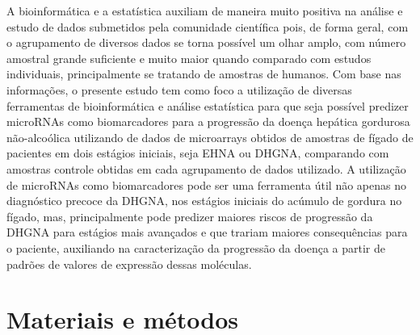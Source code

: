 \documentclass[12pt, a4paper]{article}
\begin{document}
    \par A bioinformática e a estatística auxiliam de maneira muito positiva na análise e estudo de dados submetidos pela comunidade científica pois, de forma geral, com o agrupamento de diversos dados se torna possível um olhar amplo, com número amostral grande suficiente e muito maior quando comparado com estudos individuais, principalmente se tratando de amostras de humanos. Com base nas informações, o presente estudo tem como foco a utilização de diversas ferramentas de bioinformática e análise estatística para que seja possível predizer microRNAs como biomarcadores para a progressão da doença hepática gordurosa não-alcoólica utilizando de dados de microarrays obtidos de amostras de fígado de pacientes em dois estágios iniciais, seja EHNA ou DHGNA, comparando com amostras controle obtidas em cada agrupamento de dados utilizado. A utilização de microRNAs como biomarcadores pode ser uma ferramenta útil não apenas no diagnóstico precoce da DHGNA, nos estágios iniciais do acúmulo de gordura no fígado, mas, principalmente pode predizer maiores riscos de progressão da DHGNA para estágios mais avançados e que trariam maiores consequências para o paciente, auxiliando na caracterização da progressão da doença a partir de padrões de valores de expressão dessas moléculas.

    \section{Materiais e métodos}
\end{document}
